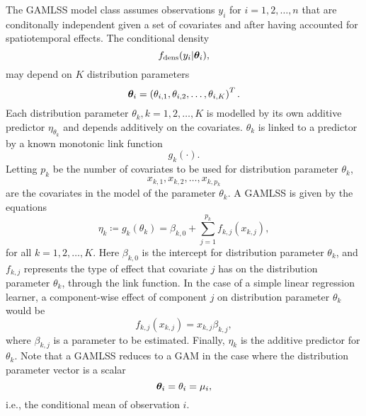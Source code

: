 The GAMLSS model class assumes observations $y_i$ for $i=1,2,\ldots,n$ that are conditonally independent given a set of covariates and after having accounted for spatiotemporal effects.
The conditional density
\begin{equation}\label{gamlss-density}
    f_{\text{dens}}(y_i|\boldsymbol{\theta}_i),
\end{equation}
may depend on $K$ distribution parameters
\begin{equation}
    \boldsymbol{\theta}_i=\left(\theta_{i,1},\theta_{i,2},\ldots,\theta_{i,K}\right)^T.
\end{equation}
Each distribution parameter $\theta_k,k=1,2,\ldots,K$ is modelled by its own additive predictor $\eta_{\theta_k}$ and depends additively
on the covariates.
$\theta_k$ is linked to a predictor by a known monotonic link function
\begin{equation}
    g_k(\cdot).
\end{equation}
Letting $p_k$ be the number of covariates to be used for distribution parameter $\theta_k$,
\begin{equation}
    x_{k,1},x_{k,2},\ldots,x_{k,p_k}
\end{equation}
are the covariates in the model of the parameter $\theta_k$.
A GAMLSS is given by the equations
\begin{equation}
    \eta_k\coloneqq g_k(\theta_k)=\beta_{k,0}+\sum_{j=1}^{p_k}f_{k,j}(x_{k,j}),
\end{equation}
for all $k=1,2,\ldots,K$. Here $\beta_{k,0}$ is the intercept for distribution parameter $\theta_k$, and $f_{k,j}$ represents the type of effect that covariate $j$ has on the distribution parameter $\theta_k$, through the link function.
In the case of a simple linear regression learner, a component-wise effect of component $j$ on distribution parameter $\theta_k$ would be
\begin{equation}
    f_{k,j}(x_{k,j})=x_{k,j}\beta_{k,j},
\end{equation}
where $\beta_{k,j}$ is a parameter to be estimated.
Finally, $\eta_{k}$ is the additive predictor for $\theta_k$.
Note that a GAMLSS reduces to a GAM \citep{gam-book} in the case where the distribution parameter vector is a scalar
\begin{equation}
    \boldsymbol{\theta}_i=\theta_i=\mu_i,
\end{equation}
i.e., the conditional mean of observation $i$.

